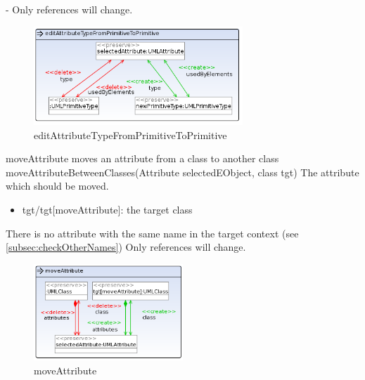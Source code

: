 {-}
{Only references will change.}
\begin{figure}[H]
  \centering
  \includegraphics[width=0.7\textwidth]{pics/editAttributeTypeFromPrimitiveToPrimitive.png}    
  \caption{editAttributeTypeFromPrimitiveToPrimitive}
  \label{editAttributeTypeFromPrimitiveToPrimitive}  
\end{figure}
\op
{moveAttribute}
{moves an attribute from a class to another class}
{moveAttributeBetweenClasses(Attribute selectedEObject, class tgt)}
{The attribute which should be moved.}
{
\begin{itemize}
 \item tgt/tgt[moveAttribute]: the target class
\end{itemize}
}
{There is no attribute with the same name in the target context (see
\ref{subsec:checkOtherNames})}
{Only references will change.}
\begin{figure}[H]
  \centering
  \includegraphics[width=0.5\textwidth]{pics/moveAttribute.png}    
  \caption{moveAttribute}
  \label{moveAttribute}  
\end{figure}